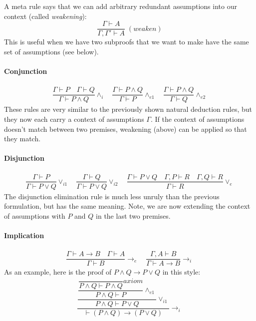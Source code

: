 \documentclass{article}
\theoremstyle{definition}
\begin{document}
A meta rule says that we can add arbitrary redundant assumptions into
our context (called \emph{weakening}):
%
\begin{equation*}
  \dfrac{\Gamma \vdash A}
        {\Gamma, \Gamma' \vdash A} \; (\textit{weaken})
  \end{equation*}
This is useful when we have two subproofs that we want to
make have the same set of assumptions (see below).

\paragraph{Conjunction}
%
\begin{align*}
\dfrac{\Gamma \vdash P \quad \Gamma \vdash Q}{\Gamma \vdash P \wedge
  Q} {\wedge_i}
\quad
\dfrac{\Gamma \vdash P \wedge Q}{\Gamma \vdash P} {\wedge_{e1}} 
\quad
\dfrac{\Gamma \vdash P \wedge Q}{\Gamma \vdash Q} {\wedge_{e2}}
\end{align*}
%
These rules are very similar to the previously shown natural
deduction rules, but they now each carry a context of assumptions
$\Gamma$. If the context of assumptions doesn't match between
two premises, weakening (above) can be applied so that they match.

\paragraph{Disjunction}

\begin{align*}
\dfrac{\Gamma \vdash P}
      {\Gamma \vdash P \vee Q}  {\vee_{i1}}
\quad
\dfrac{\Gamma \vdash Q}
      {\Gamma \vdash P \vee Q} {\vee_{i2}}
\quad
\dfrac{\Gamma \vdash P \vee Q
  \quad \Gamma, P \vdash R
  \quad \Gamma, Q \vdash R}
      {\Gamma \vdash R} {\vee_{e}}
\end{align*}
%
The disjunction elimination rule is much less unruly than the previous
formulation, but has the same meaning. Note, we are now extending the
context of assumptions with $P$ and $Q$ in the last two premises.

\paragraph{Implication}

\begin{align*}
\dfrac{\Gamma \vdash A \rightarrow B \quad \Gamma \vdash A}
      {\Gamma \vdash B} {\rightarrow_e}
\quad
\dfrac{\Gamma, A \vdash B}{\Gamma \vdash A \rightarrow B}
 {\rightarrow_i}
\end{align*}
As an example, here is the proof of $P \wedge Q \rightarrow P \vee Q$
in this style:
%
\newcommand{\pAB}{\dfrac{}{P \wedge Q \vdash P \wedge Q} {\textit{axiom}}}
\begin{align*}
  \dfrac{
  \dfrac{\dfrac{\pAB}{P \wedge Q \vdash P} {\wedge_{e1}}}
  {P \wedge Q \vdash P \vee Q} {\vee_{i1}}}
  {\vdash (P \wedge Q) \rightarrow (P \vee Q)} {\rightarrow_{i}}
\end{align*}
\end{document}
